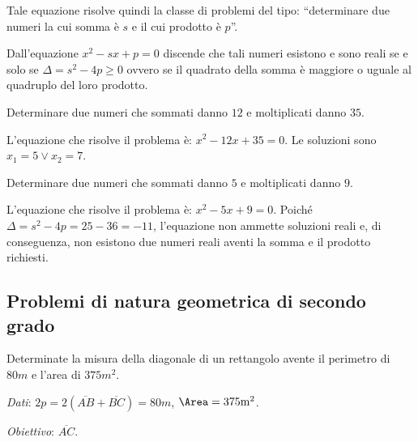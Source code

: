 Tale equazione risolve quindi la classe di problemi del tipo: ``determinare due numeri la cui somma è $s$ e il cui prodotto è $p$''.

Dall'equazione $x^{2} - s x + p = 0$ discende che tali numeri esistono e sono reali se e solo se $\Delta =s^{2}-4p\geq 0$ ovvero se il quadrato della somma è maggiore o uguale al quadruplo del loro prodotto.
\begin{exrig}
\begin{esempio}
Determinare due numeri che sommati danno $12$ e moltiplicati danno $35$.

L'equazione che risolve il problema è: $x^{2} - 12 x + 35 = 0$. Le soluzioni sono $x_{1} = 5 \vee x_{2} = 7$.
\end{esempio}

\begin{esempio}
Determinare due numeri che sommati danno $5$ e moltiplicati danno $9$.

L'equazione che risolve il problema è: $x^{2} - 5 x + 9 = 0$. Poiché $\Delta = s^{2} - 4 p = 25 - 36 = - 11$, l'equazione non ammette soluzioni reali e, di conseguenza, non esistono due numeri reali aventi la somma e il prodotto richiesti.
\end{esempio}
\end{exrig}
\vspazio\ovalbox{\risolvii \ref{ese:3.77}, \ref{ese:3.78}, \ref{ese:3.79}, \ref{ese:3.80}}
\pagebreak
\subsection{Problemi di natura geometrica di secondo grado}

\begin{problema}
Determinate la misura della diagonale di un rettangolo avente il perimetro di $80\unit{m}$ e l'area di $375\unit{m^2}$.
\end{problema}

\begin{center}
 
\end{center}

\emph{Dati}: $2p = 2(\overline{AB}+\overline{BC})= 80\unit{m}$, $\Area = 375\unit{m^2}$.

\emph{Obiettivo}: $\overline{AC}$.

